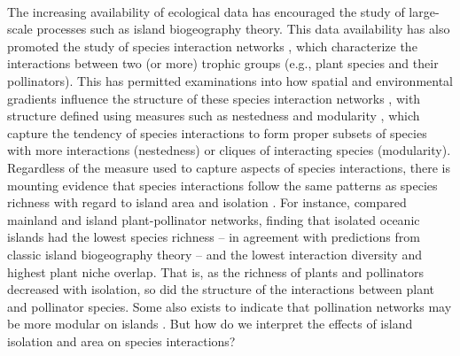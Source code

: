 \paragraph*{}
The increasing availability of ecological data has encouraged the study of large-scale processes such as island biogeography theory. This data availability has also promoted the study of species interaction networks \parencite{delmas2019, dormann2017}, which characterize the interactions between two (or more) trophic groups (e.g., plant species and their pollinators). This has permitted examinations into how spatial and environmental gradients influence the structure of these species interaction networks \parencite{tylianakis2017}, with structure defined using measures such as nestedness and modularity \parencite{dalsgaard2013, dormann2017}, which capture the tendency of species interactions to form proper subsets of species with more interactions (nestedness) or cliques of interacting species (modularity). Regardless of the measure used to capture aspects of species interactions, there is mounting evidence that species interactions follow the same patterns as species richness with regard to island area and isolation \parencite{sugiura2010, dormann2017, tylianakis2017}. For instance, \citet{traveset2016} compared mainland and island plant-pollinator networks, finding that isolated oceanic islands had the lowest species richness -- in agreement with predictions from classic island biogeography theory -- and the lowest interaction diversity and highest plant niche overlap. That is, as the richness of plants and pollinators decreased with isolation, so did the structure of the interactions between plant and pollinator species. Some also exists to indicate that pollination networks may be more modular on islands \parencite{dalsgaard2013}. But how do we interpret the effects of island isolation and area on species interactions?




